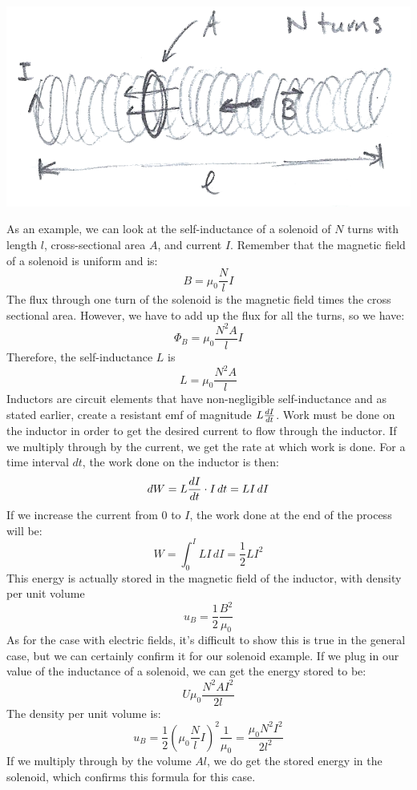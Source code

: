 \begin{center}
	\includegraphics[scale=0.25]{images/em/inductor.png}
\end{center}
As an example, we can look at the self-inductance of a solenoid of $N$ turns with length $l$, cross-sectional area $A$, and current $I$. Remember that the magnetic field of a solenoid is uniform and is:
\[
	B = \mu_0 \frac{N}{l}I
\]
The flux through one turn of the solenoid is the magnetic field times the cross sectional area. However, we have to add up the flux for all the turns, so we have:
\[
	\Phi_B = \mu_0 \frac{N^2A}{l} I
\]
Therefore, the self-inductance $L$ is
\[
	L = \mu_0 \frac{N^2A}{l}
\]
Inductors are circuit elements that have non-negligible self-inductance and as stated earlier, create a resistant emf of magnitude $L\frac{d I}{d t}$. Work must be done on the inductor in order to get the desired current to flow through the inductor. If we multiply through by the current, we get the rate at which work is done. For a time interval $dt$, the work done on the inductor is then:
\[
	dW = L\frac{d I}{d t} \cdot I \, dt = LI\, dI
\]
If we increase the current from $0$ to $I$, the work done at the end of the process will be: 
\[
	W = \int_0^I LI\, dI = \frac{1}{2}LI^2
\]
This energy is actually stored in the magnetic field of the inductor, with density per unit volume
\[
	u_B = \frac{1}{2} \frac{B^2}{\mu_0}
\]
As for the case with electric fields, it's difficult to show this is true in the general case, but we can certainly confirm it for our solenoid example. If we plug in our value of the inductance of a solenoid, we can get the energy stored to be:
\[
	U \mu_0 \frac{N^2AI^2}{2l}
\]
The density per unit volume is:
\[
	u_B = \frac{1}{2} \left( \mu_0 \frac{N}{l}I\right)^2 \frac{1}{\mu_0} = \frac{\mu_0 N^2 I^2}{2l^2}
\]
If we multiply through by the volume $Al$, we do get the stored energy in the solenoid, which confirms this formula for this case.\\
